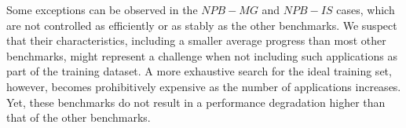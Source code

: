 Some exceptions can be observed in the $NPB-MG$ and $NPB-IS$ cases, which are not controlled as efficiently or as stably as the other benchmarks. We suspect that their characteristics, including a smaller average progress than most other benchmarks, might represent a challenge when not including such applications as part of the training dataset. A more exhaustive search for the ideal training set, however, becomes  prohibitively expensive as the number of applications increases. Yet, these benchmarks do not result in a performance degradation higher than that of the other benchmarks.




